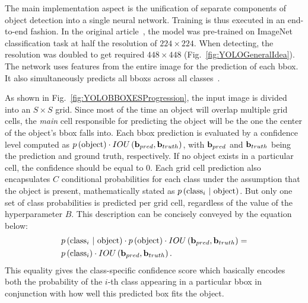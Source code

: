 The main implementation aspect is the unification of separate components of object detection into a single neural network. Training is thus executed in an end-to-end fashion. In the original article~\cite{redmon2016yolo}, the model was pre-trained on ImageNet~\cite{deng2009imagenet} classification task at half the resolution of $224 \times 224$. When detecting, the resolution was doubled to get required $448 \times 448$ (Fig.~\ref{fig:YOLOGeneralIdea}). The network uses features from the entire image for the prediction of each \gls{bbox}. It also simultaneously predicts all \glspl{bbox} across all classes~\cite{redmon2016yolo}.

As shown in Fig.~\ref{fig:YOLOBBOXESProgression}, the input image is divided into an $S \times S$ grid. Since most of the time an object will overlap multiple grid cells, the \emph{main} cell responsible for predicting the object will be the one the center of the object's \gls{bbox} falls into. Each \gls{bbox} prediction is evaluated by a confidence level computed as $p \left( \text{object} \right) \cdot {IOU} \left( \mathbf{b}_{pred}, \mathbf{b}_{truth} \right)$, with $\mathbf{b}_{pred}$ and $\mathbf{b}_{truth}$ being the prediction and ground truth, respectively. If no object exists in a particular cell, the confidence should be equal to $0$. Each grid cell prediction also encapsulates $C$ conditional probabilities for each class under the assumption that the object is present, mathematically stated as $p \left( {\text{class}}_i \ | \ \text{object} \right)$. But only one set of class probabilities is predicted per grid cell, regardless of the value of the hyperparameter $B$. This description can be concisely conveyed by the equation below:
\begin{equation}
    \begin{aligned}
        \label{eq:YOLOCOnfidenceScores}
         & p \left( {\text{class}}_i \ | \ \text{object} \right)
        \cdot
        p \left( \text{object} \right)
        \cdot
        {IOU} \left( \mathbf{b}_{pred}, \mathbf{b}_{truth} \right)
        =                                              \\
         & p \left( {\text{class}}_i \right)
        \cdot
        {IOU} \left( \mathbf{b}_{pred}, \mathbf{b}_{truth} \right).
    \end{aligned}
\end{equation}
This equality gives the class-specific confidence score which basically encodes both the probability of the $i$-th class appearing in a particular \gls{bbox} in conjunction with how well this predicted box fits the object.

